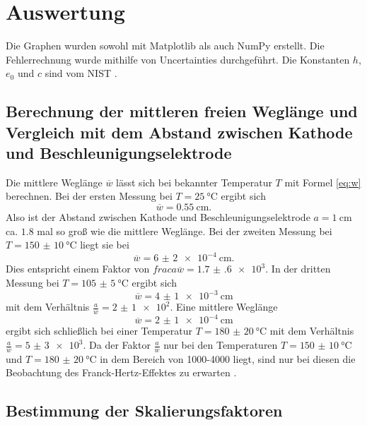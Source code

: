 \section{Auswertung}
\label{sec:Auswertung}


Die Graphen wurden sowohl mit Matplotlib \cite{matplotlib} als auch NumPy \cite{numpy} erstellt. Die
Fehlerrechnung wurde mithilfe von Uncertainties \cite{uncertainties} durchgeführt.
Die Konstanten $h$, $e_0$ und $c$ sind vom NIST \cite{nistgov}.

\subsection{Berechnung der mittleren freien Weglänge und Vergleich mit dem Abstand zwischen Kathode und Beschleunigungselektrode}
Die mittlere Weglänge $\overline{w}$ lässt sich bei bekannter Temperatur $T$ mit Formel \ref{eq:w} berechnen.
Bei der ersten Messung bei $T=\SI{25}{\degreeCelsius}$ ergibt sich
\begin{displaymath}
	\overline{w}=\SI{ 0.55}{\centi\meter}\text{.}
\end{displaymath}
Also ist der Abstand zwischen Kathode und Beschleunigungselektrode $a=\SI{1}{\centi\meter}$ ca. $1.8$ mal so groß wie die mittlere Weglänge.
Bei der zweiten Messung bei $T=\SI{150(10)}{\degreeCelsius}$ liegt sie bei
\begin{displaymath}
\overline{w}=\SI{6(2)e-4}{\centi\meter}\text{.}
\end{displaymath}
Dies entspricht einem Faktor von $frac{a}{\overline{w}}=\num{1.7(6)e3}$. In der dritten Messung bei $T=\SI{105(5)}{\degreeCelsius}$ ergibt sich
\begin{displaymath}
\overline{w}=\SI{4(1)e-3}{\centi\meter}
\end{displaymath}
mit dem Verhältnis $\frac{a}{\overline{w}}=\num{2(1)e2}$. Eine mittlere Weglänge
\begin{displaymath}
\overline{w}=\SI{2(1)e-4}{\centi\meter}
\end{displaymath}
ergibt sich schließlich bei einer Temperatur $T=\SI{180(20)}{\degreeCelsius}$ mit dem Verhältnis $\frac{a}{\overline{w}}=\num{5(3)e3}$. Da der Faktor $\frac{a}{\overline{w}}$ nur bei den Temperaturen $T=\SI{150(10)}{\degreeCelsius}$ und $T=\SI{180(20)}{\degreeCelsius}$ in dem Bereich von 1000-4000 liegt, sind nur bei diesen die Beobachtung des Franck-Hertz-Effektes zu erwarten \cite{V601}.


\subsection{Bestimmung der Skalierungsfaktoren}

